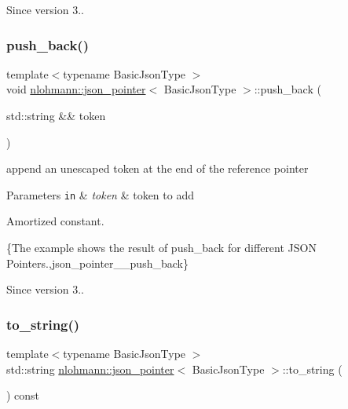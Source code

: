 \begin{DoxySince}{Since}
version 3.. 
\end{DoxySince}
\mbox{\label{classnlohmann_1_1json__pointer_ac228b13596d3c34185da9fe61b570194}} 
\subsubsection{\texorpdfstring{push\+\_\+back()}{push\_back()}\hspace{0.1cm}{\footnotesize\ttfamily [2/2]}}
{\footnotesize\ttfamily template$<$typename Basic\+Json\+Type $>$ \\
void \hyperlink{classnlohmann_1_1json__pointer}{nlohmann\+::json\+\_\+pointer}$<$ Basic\+Json\+Type $>$\+::push\+\_\+back (\begin{DoxyParamCaption}\item[{std\+::string \&\&}]{token }\end{DoxyParamCaption})\hspace{0.3cm}{\ttfamily [inline]}}



append an unescaped token at the end of the reference pointer 


\begin{DoxyParams}[1]{Parameters}
\mbox{\tt in}  & {\em token} & token to add\\
\hline
\end{DoxyParams}
Amortized constant.

\{The example shows the result of {\ttfamily push\+\_\+back} for different J\+S\+ON Pointers.,json\+\_\+pointer\+\_\+\+\_\+push\+\_\+back\}

\begin{DoxySince}{Since}
version 3.. 
\end{DoxySince}
\mbox{\label{classnlohmann_1_1json__pointer_a3d4b15d32d096e3776c5d2c773b524f5}} 
\subsubsection{\texorpdfstring{to\+\_\+string()}{to\_string()}}
{\footnotesize\ttfamily template$<$typename Basic\+Json\+Type $>$ \\
std\+::string \hyperlink{classnlohmann_1_1json__pointer}{nlohmann\+::json\+\_\+pointer}$<$ Basic\+Json\+Type $>$\+::to\+\_\+string (\begin{DoxyParamCaption}{ }\end{DoxyParamCaption}) const\hspace{0.3cm}{\ttfamily [inline]}}



